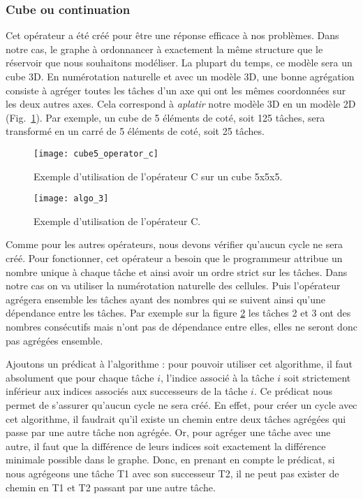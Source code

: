 \subsubsection{Cube ou continuation}
Cet opérateur a été créé pour être une réponse efficace à nos problèmes.
%
Dans notre cas, le graphe à ordonnancer à exactement la même structure que le réservoir que nous souhaitons modéliser.
%
La plupart du temps, ce modèle sera un cube 3D.
%
En numérotation naturelle et avec un modèle 3D, une bonne agrégation consiste à agréger toutes les tâches d'un axe qui ont les mêmes coordonnées sur les deux autres axes.
%
Cela correspond à {\em aplatir} notre modèle 3D en un modèle 2D (Fig.~\ref{fig:cube5_algo_C}).
%
Par exemple, un cube de 5 éléments de coté, soit 125 tâches, sera transformé en un carré de 5 éléments de coté, soit 25 tâches.


\begin{figure}[t!]
  \centering
  \texttt{[image: cube5\_operator\_c]}
  \caption{Exemple d'utilisation de l'opérateur C sur un cube 5x5x5.}
  \label{fig:cube5_algo_C}
\end{figure}


\begin{figure}[t!]
  \centering
  \texttt{[image: algo\_3]}
  \caption{Exemple d'utilisation de l'opérateur C.}
  \label{fig:algo_C}
\end{figure}


Comme pour les autres opérateurs, nous devons vérifier qu'aucun cycle ne sera créé.
%
Pour fonctionner, cet opérateur a besoin que le programmeur attribue un nombre unique à chaque tâche et ainsi avoir un ordre strict sur les tâches.
%
Dans notre cas on va utiliser la numérotation naturelle des cellules.
%
Puis l'opérateur agrégera ensemble les tâches ayant des nombres qui se suivent ainsi qu'une dépendance entre les tâches.
%
Par exemple sur la figure \ref{fig:algo_C} les tâches 2 et 3 ont des nombres consécutifs mais n'ont pas de dépendance entre elles, elles ne seront donc pas agrégées ensemble.


Ajoutons un prédicat à l'algorithme : pour pouvoir utiliser cet algorithme, il faut absolument que pour chaque tâche $i$, l'indice associé à la tâche $i$ soit strictement inférieur aux indices associés aux successeurs de la tâche $i$.
%
Ce prédicat nous permet de s'assurer qu'aucun cycle ne sera créé.
%
En effet, pour créer un cycle avec cet algorithme, il faudrait qu'il existe un chemin entre deux tâches agrégées qui passe par une autre tâche non agrégée.
%
Or, pour agréger une tâche avec une autre, il faut que la différence de leurs indices soit exactement la différence minimale possible dans le graphe.
%
Donc, en prenant en compte le prédicat, si nous agrégeons une tâche T1 avec son successeur T2, il ne peut pas exister de chemin en T1 et T2 passant par une autre tâche.



